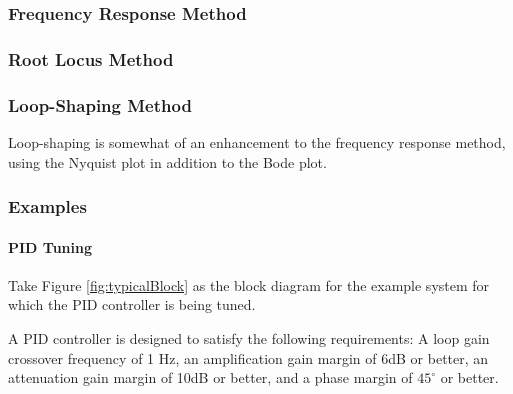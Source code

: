\documentclass[../notes.tex]{subfiles}
\begin{document}
\subsubsection{Frequency Response Method}
\subsubsection{Root Locus Method}


\subsubsection{Loop-Shaping Method}
Loop-shaping is somewhat of an enhancement to the frequency response method, using the Nyquist plot in addition to the Bode plot.

\subsubsection{Examples}
\paragraph{PID Tuning}
Take Figure \ref{fig:typicalBlock} as the block diagram for the example system for which the PID controller is being tuned.

A PID controller is designed to satisfy the following requirements: A loop gain crossover frequency of 1 Hz, an amplification gain margin of 6dB or better, an attenuation gain margin of 10dB or better, and a phase margin of $45^{\circ}$ or better.
\end{document}
